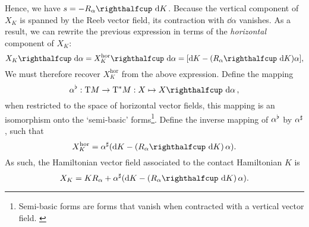 Hence, we have \(s = -\intpr{R_\alpha}{\dd{K}}\). Because the vertical component of \(X_K\) is spanned by the Reeb vector field, its contraction with \(\dd{\alpha}\) vanishes. As a result, we can rewrite the previous expression in terms of the \emph{horizontal} component of \(X_K\):
\begin{equation}
    \intpr{X_K}{\dd{\alpha}} = \intpr{X_K^\text{hor}}{\dd{\alpha}}=  \qty[\dd{K} - \qty(\intpr{R_\alpha}{\dd{K}})\alpha], 
    \label{eq:basic_form}
\end{equation}
We must therefore recover \(X^\text{hor}_K\) from the above expression. Define the mapping  
\begin{equation}
     \toDual{\alpha}: \tbundle{M} \to \ctbundle{M}: X \mapsto  \intpr{X}{\dd{\alpha}},
\end{equation}
when restricted to the space of horizontal vector fields, this mapping is an isomorphism onto the `semi-basic' forms\footnote{Semi-basic forms are forms that vanish when contracted with a vertical vector field. \cite{Libermann1987}}. Define the inverse mapping of \(\alpha^\flat\) by \(\alpha^\sharp\), such that
\begin{equation}
     X_K^\text{hor} = \fromDual{\alpha}\qty(\dd{K} - \qty(\intpr{R_\alpha}{\dd{K}})\,\alpha).
\end{equation}
As such, the Hamiltonian vector field associated to the contact Hamiltonian \(K\) is
\begin{equation}
    X_K = K R_\alpha + \fromDual{\alpha}(\dd{K} - \qty(\intpr{R_\alpha}{\dd{K}})\,\alpha).
    \label{eq:contact_ham_vf_cofree}
\end{equation}

